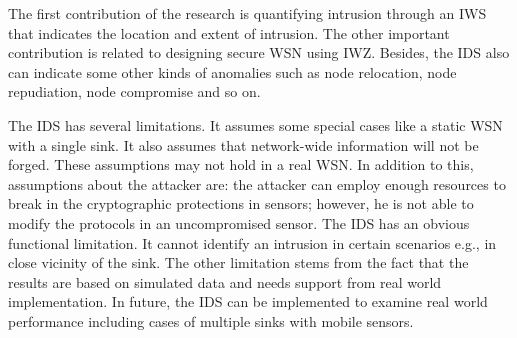 \documentclass[conference]{IEEEtran}
\begin{document}
The first contribution of the research is quantifying intrusion through an IWS that indicates the location and extent of intrusion.
The other important contribution is related to designing secure WSN using IWZ.
Besides, the IDS also can indicate some other kinds of anomalies such as node relocation, node repudiation, node compromise and so on.

The IDS has several limitations. 
It assumes some special cases like a static WSN with a single sink.
It also assumes that network-wide information will not be forged. %
These assumptions may not hold in a real WSN.
In addition to this, assumptions about the attacker are: the attacker can employ enough resources to break in the cryptographic protections in sensors; however, he is not able to modify the protocols in an uncompromised sensor.
The IDS has an obvious functional limitation.
It cannot identify an intrusion in certain scenarios e.g., 
in close vicinity of the sink.%
The other limitation stems from the fact that the results are based on simulated data and needs support from real world implementation.
In future,  the IDS can be implemented to examine real world performance including cases of multiple sinks with mobile sensors.






\IEEEtriggercmd{\enlargethispage{-5in}}






\end{document}
